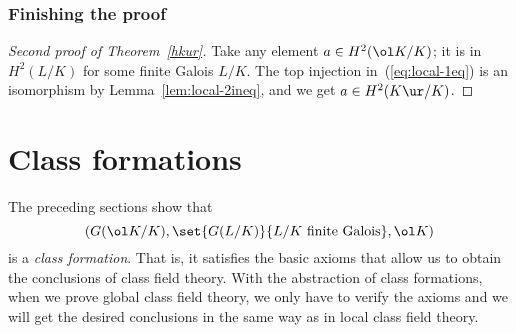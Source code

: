 \subsubsection{Finishing the proof}
\begin{proof}[Second proof of Theorem~\ref{hkur}]
Take any element $a\in H^2(\ol K/K)$; it is in $H^2(L/K)$ for some finite Galois $L/K$. The top injection in~(\ref{eq:local-1eq}) is an isomorphism by Lemma~\ref{lem:local-2ineq}, and we get $a\in H^2(K\ur/K)$.
\end{proof}
\section{Class formations}
The preceding sections show that 
\[(G(\ol K/K),\set{G(L/K)}{L/K\text{ finite Galois}},\ol K)\]
is a {\it class formation}. That is, it satisfies the basic axioms that allow us to obtain the conclusions of class field theory. With the abstraction of class formations, when we prove global class field theory, we only have to verify the axioms and we will get the desired conclusions in the same way as in local class field theory.
